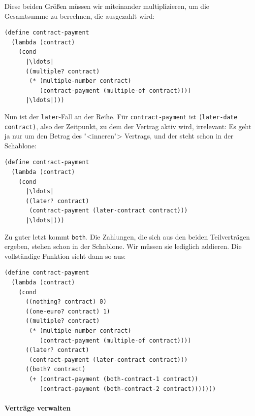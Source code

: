 % 
Diese beiden Größen müssen wir miteinander multiplizieren, um die
Gesamtsumme zu berechnen, die ausgezahlt wird:
%
\begin{lstlisting}
(define contract-payment
  (lambda (contract)
    (cond
      |\ldots|
      ((multiple? contract)
       (* (multiple-number contract)
          (contract-payment (multiple-of contract))))
      |\ldots|)))
\end{lstlisting}
%
Nun ist der \texttt{later}-Fall an der Reihe.  Für
\lstinline{contract-payment} ist \lstinline{(later-date contract)},
also der Zeitpunkt, zu dem der Vertrag aktiv wird, irrelevant: Es geht
ja nur um den Betrag des "<inneren"> Vertrags, und der steht schon in
der Schablone:
%
\begin{lstlisting}
(define contract-payment
  (lambda (contract)
    (cond
      |\ldots|
      ((later? contract)
       (contract-payment (later-contract contract)))
      |\ldots|)))
\end{lstlisting}
%
Zu guter letzt kommt \lstinline{both}.  Die Zahlungen, die sich aus
den beiden Teilverträgen ergeben, stehen schon in der Schablone.  Wir
müssen sie lediglich addieren.  Die vollständige Funktion sieht dann
so aus:
%
\begin{lstlisting}
(define contract-payment
  (lambda (contract)
    (cond
      ((nothing? contract) 0)
      ((one-euro? contract) 1)
      ((multiple? contract)
       (* (multiple-number contract)
          (contract-payment (multiple-of contract))))
      ((later? contract)
       (contract-payment (later-contract contract)))
      ((both? contract)
       (+ (contract-payment (both-contract-1 contract))
          (contract-payment (both-contract-2 contract)))))))
\end{lstlisting}

\paragraph{Verträge verwalten}

